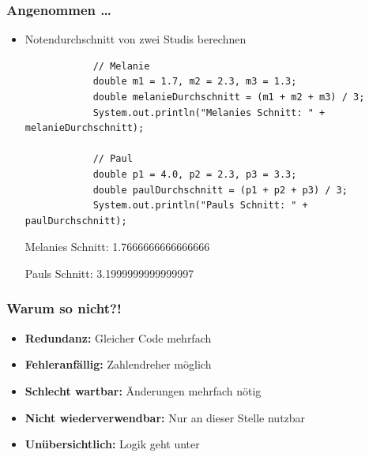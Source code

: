 \documentclass{../../presentation}
\begin{document}
\begin{frame}[fragile]
	\frametitle{Angenommen \dots}
	\begin{itemize}
		\item\pause Notendurchschnitt von zwei Studis berechnen
		      \begin{verbatim}
            // Melanie
            double m1 = 1.7, m2 = 2.3, m3 = 1.3;
            double melanieDurchschnitt = (m1 + m2 + m3) / 3;
            System.out.println("Melanies Schnitt: " + melanieDurchschnitt);

            // Paul
            double p1 = 4.0, p2 = 2.3, p3 = 3.3;
            double paulDurchschnitt = (p1 + p2 + p3) / 3;
            System.out.println("Pauls Schnitt: " + paulDurchschnitt);
        \end{verbatim}
		      \begin{ausgabe}
			      Melanies Schnitt: 1.7666666666666666

			      Pauls Schnitt: 3.1999999999999997
		      \end{ausgabe}
	\end{itemize}
\end{frame}

\begin{frame}[fragile]
	\frametitle{Warum so nicht?!}
	\begin{itemize}
		\item\pause \textbf{Redundanz:} Gleicher Code mehrfach
		\item\pause \textbf{Fehleranfällig:} Zahlendreher möglich
		\item\pause \textbf{Schlecht wartbar:} Änderungen mehrfach nötig
		\item\pause \textbf{Nicht wiederverwendbar:} Nur an dieser Stelle nutzbar
		\item\pause \textbf{Unübersichtlich:} Logik geht unter
	\end{itemize}
	\vspace{2em}
	\begin{minipage}{\textwidth}
		\centering
		\onslide\pause{\Huge $\rightarrow$~}%
	\end{minipage}
\end{frame}
\end{document}
